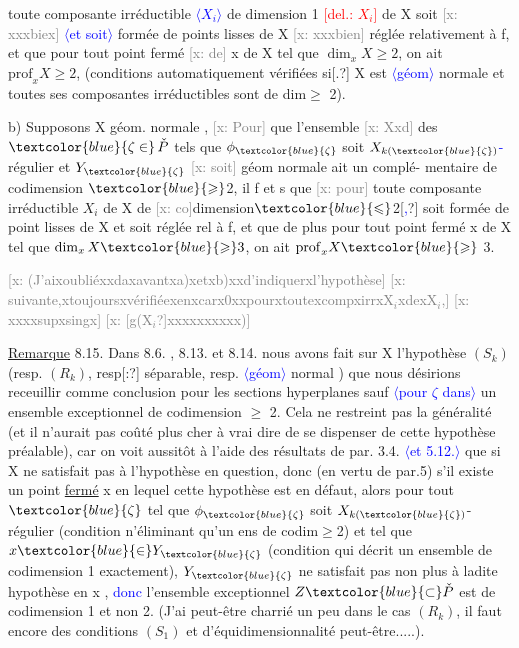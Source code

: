 \documentclass[11pt]{article}
\newcommand{\scanpage}[1]{\par\bigskip\noindent{\small\sffamily[scan #1]}\par}
\newcommand{\mspage}[1]{{\small\sffamily[p.\,#1]}}
\newcommand{\hand}[1]{\textcolor{blue}{#1}}
\let\over\relax
\newcommand{\over}[2]{\textcolor{gray}{#1}\textcolor{blue}{\ensuremath{^{\!\nearrow}}#2}}
\newcommand{\inserted}[2][]{\textcolor{blue}{$\langle$#2$\rangle$}}
\newcommand{\deleted}[1]{\textcolor{red}{[\textsf{del.:} #1]}}
\newcommand{\xout}[1]{\textcolor{gray}{[\textsf{x:} #1]}}
\newcommand{\uline}[1]{\underline{#1}}
\newcommand{\unsure}[1]{[#1?]}
\begin{document}
\mspage{48}

\clearpage
\scanpage{25/49}
\mspage{45}

toute composante irréductible \inserted{$X_i$} de dimension 1 \deleted{$X_i$} de X soit \xout{xxxbiex}
\inserted[typed]{et soit}
formée de points lisses de X \xout{xxxbien} réglée relativement à f, et que
pour tout point fermé \xout{de} x de X tel que $\dim_x X \geqslant 2$, on ait $\mathrm{prof}_x X \geqslant 2$,
(conditions automatiquement vérifiées si\unsure{.} X est \inserted{géom} normale et toutes ses
composantes irréductibles sont de dim$\geqslant$ 2).

b) Supposons X géom. normale , \xout{Pour} que l'ensemble \xout{Xxd} des $\hand{\zeta \in}\, \check{P}$
tels que $\phi_{\hand{\zeta}}$ soit $X_{k(\hand{\zeta})}$\hand{-}régulier et $Y_{\hand{\zeta}}$ \xout{soit} géom normale ait un complé-%
mentaire de codimension $\hand{\geqslant}$2, il f et s que \xout{pour} toute composante
irréductible $X_i$ de X de \xout{co}dimension$\hand{\leqslant}$2\unsure{\hand{,}} soit formée de point lisses de
X et soit réglée rel à f, et que de plus pour tout point fermé x de X
tel que $\dim_x X \hand{\geqslant} 3$, on ait $\mathrm{prof}_x X \hand{\geqslant}$ 3.

\xout{(J'aixoubliéxxdaxavantxa)xetxb)xxd'indiquerxl'hypothèse}
\xout{suivante,xtoujoursxvérifiéexenxcarx0xxpourxtoutexcompxirrxX$_i$xdexX$_i$,}
\xout{xxxxsupxsingx}
\xout{\unsure{g(X$_i$}xxxxxxxxxx)}

\uline{Remarque} 8.15. Dans 8.6. , 8.13. et 8.14. nous avons fait sur X
l'hypothèse $(S_k)$ (resp. $(R_k)$, resp\unsure{:} séparable, resp. \inserted[typed]{géom} normal ) que
nous désirions receuillir comme conclusion pour les sections hyperplanes
sauf \inserted{pour $\zeta$ dans} un ensemble exceptionnel de codimension $\geqslant$ 2. Cela ne restreint
pas la généralité (et il n'aurait pas coûté plus cher à vrai dire
de se dispenser de cette hypothèse préalable), car on voit aussitôt
à l'aide des résultats de par. 3.4. \inserted{et 5.12.} que si X ne satisfait pas à
l'hypothèse en question, donc (en vertu de par.5) s'il existe un point
\uline{fermé} x en lequel cette hypothèse est en défaut, alors pour tout $\hand{\zeta}$ tel
que $\phi_{\hand{\zeta}}$ soit $X_{k(\hand{\zeta})}$-régulier (condition n'éliminant qu'un ens de codim$\geqslant$2)
et tel que $x \hand{\in} Y_{\hand{\zeta}}$ (condition qui décrit un ensemble de codimension 1
exactement), $Y_{\hand{\zeta}}$ ne satisfait pas non plus à ladite hypothèse en x ,
\hand{donc} l'ensemble exceptionnel $Z \hand{\subset} \check{P}$ est de codimension 1 et non 2.
(J'ai peut-être charrié un peu dans le cas $(R_k)$, \over{o}{où} il faut encore
des conditions $(S_1)$ et d'équidimensionnalité peut-être.....).
\end{document}
